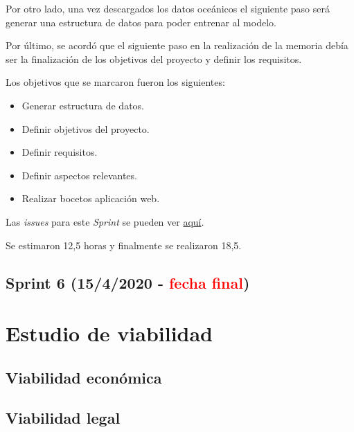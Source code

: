 Por otro lado, una vez descargados los datos oceánicos el siguiente paso será generar una estructura de datos para poder entrenar al modelo.

Por último, se acordó que el siguiente paso en la realización de la memoria debía ser la finalización de los objetivos del proyecto y definir los requisitos.

Los objetivos que se marcaron fueron los siguientes:
\begin{itemize}
	\item Generar estructura de datos.
	\item Definir objetivos del proyecto.
	\item Definir requisitos.
	\item Definir aspectos relevantes.
	\item Realizar bocetos aplicación web.
\end{itemize}

Las \emph{issues} para este \emph{Sprint} se pueden ver \href{https://github.com/psnti/TFG-Pablo-Santidrian-Tudanca/milestone/5}{aquí}.


Se estimaron 12,5 horas y finalmente se realizaron 18,5.

\subsection{Sprint 6 (15/4/2020 - \textcolor{red}{fecha final})}\label{Sprint-5}

%
%

\section{Estudio de viabilidad}

\subsection{Viabilidad económica}

\subsection{Viabilidad legal}


